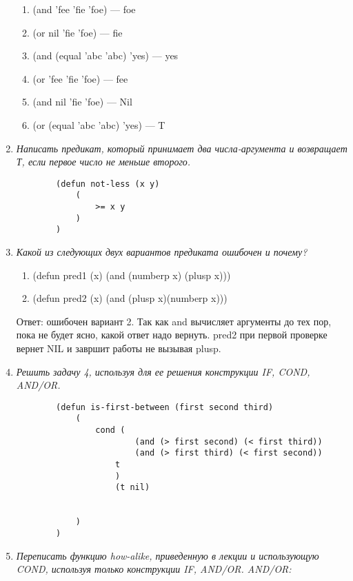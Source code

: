 \begin{enumerate}[wide=0pt]
		\begin{enumerate}[label=\arabic*)]
			\item (and 'fee 'fie 'foe) --- foe
			\item (or nil 'fie 'foe) --- fie
			\item (and (equal 'abc 'abc) 'yes) --- yes
			\item (or 'fee 'fie 'foe) --- fee
			\item (and nil 'fie 'foe) --- Nil
			\item (or (equal 'abc 'abc) 'yes) --- T
		\end{enumerate}

	\item  \textit{Написать предикат, который принимает два числа-аргумента и 
	возвращает Т, если первое число не меньше второго.}

	\begin{lstlisting}
		(defun not-less (x y)
			(
				>= x y
			)
		)
	\end{lstlisting}

	\item  \textit{Какой из следующих двух вариантов предиката ошибочен и почему?}
	
		\begin{enumerate}[label=\arabic*)]
			\item (defun pred1 (x) (and (numberp x) (plusp x)))
			\item (defun pred2 (x) (and (plusp x)(numberp x)))
		\end{enumerate}

		Ответ: ошибочен вариант 2. Так как and вычисляет аргументы до тех пор,
		пока не будет ясно, какой ответ надо вернуть. pred2 при первой проверке
		вернет NIL и завршит работы не вызывая plusp.

	\item  \textit{Решить задачу 4, используя для ее решения конструкции IF, COND,
	AND/OR.}
	

	\begin{lstlisting}
		(defun is-first-between (first second third)
			(
				cond ( 
						(and (> first second) (< first third))
						(and (> first third) (< first second))
					t
					)
					(t nil)
					
				
			)
		)
	\end{lstlisting}




	\item  \textit{Переписать функцию how-alike, приведенную в лекции и использующую
	COND, используя только конструкции IF, AND/OR.
	AND/OR:}


\end{enumerate}
